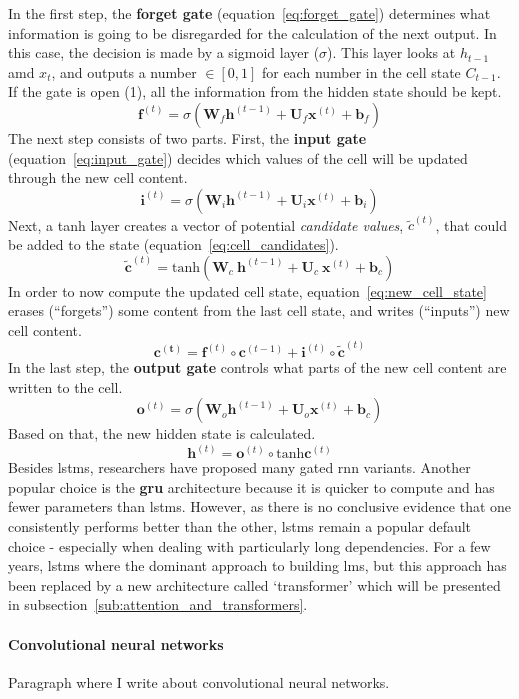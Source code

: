 In the first step, the \textbf{forget gate} (equation~\ref{eq:forget_gate}) determines what information is going to be disregarded for the calculation of the next output. In this case, the decision is made by a sigmoid layer ($ \sigma $). This layer looks at $ h_{t-1} $ amd $ x_t $, and outputs a number $ \in [0, 1] $ for each number in the cell state $ C_{t-1} $. If the gate is open (1), all the information from the hidden state should be kept.
\begin{equation}
	\label{eq:forget_gate}
	\pmb{f}^{(t)} = \sigma \left( \pmb{W}_f \pmb{h}^{(t-1)} + \pmb{U}_f \pmb{x}^{(t)} + \pmb{b}_f \right)
\end{equation}
The next step consists of two parts. First, the \textbf{input gate} (equation~\ref{eq:input_gate}) decides which values of the cell will be updated through the new cell content.
\begin{equation}
	\label{eq:input_gate}
	\pmb{i}^{(t)} = \sigma \left( \pmb{W}_i \pmb{h}^{(t-1)} + \pmb{U}_i \pmb{x}^{(t)} + \pmb{b}_i \right)
\end{equation}
Next, a tanh layer creates a vector of potential \textit{candidate values}, $ \widetilde{c}^{(t)} $, that could be added to the state (equation~\ref{eq:cell_candidates}).
\begin{equation}
	\label{eq:cell_candidates}
	\widetilde{\pmb{c}}^{(t)} = \text{tanh} \left( \pmb{W}_c \ \pmb{h}^{(t-1)} + \pmb{U}_c \ \pmb{x}^{(t)} + \pmb{b}_c \right)
\end{equation}
In order to now compute the updated cell state, equation~\ref{eq:new_cell_state} erases (``forgets'') some content from the last cell state, and writes (``inputs'') new cell content.
\begin{equation}
	\label{eq:new_cell_state}
	\pmb{c^{(t)}} = \pmb{f}^{(t)} \circ \pmb{c}^{(t-1)} + \pmb{i}^{(t)} \circ \widetilde{\pmb{c}}^{(t)}
\end{equation}
In the last step, the \textbf{output gate} controls what parts of the new cell content are written to the cell.
\begin{equation}
	\pmb{o}^{(t)} = \sigma \left( \pmb{W}_o \pmb{h}^{(t-1)} + \pmb{U}_o \pmb{x}^{(t)} + \pmb{b}_c \right)
\end{equation}
Based on that, the new hidden state is calculated.
\begin{equation}
	\pmb{h}^{(t)} = \pmb{o}^{(t)} \circ \text{tanh} \pmb{c}^{(t)}
\end{equation}
Besides \gls{lstm}s, researchers have proposed many gated \gls{rnn} variants. Another popular choice is the \textbf{\gls{gru}} architecture because it is quicker to compute and has fewer parameters than \gls{lstm}s. However, as there is no conclusive evidence that one consistently performs better than the other, \gls{lstm}s remain a popular default choice - especially when dealing with particularly long dependencies. For a few years, \gls{lstm}s where the dominant approach to building \gls{lm}s, but this approach has been replaced by a new architecture called `transformer' which will be presented in subsection~\ref{sub:attention_and_transformers}.

\bigskip

\paragraph{Convolutional neural networks}

Paragraph where I write about convolutional neural networks.